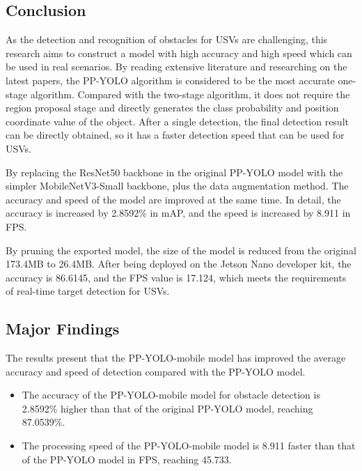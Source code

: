 \documentclass[sensors,article,submit,moreauthors,pdftex]{Definitions/mdpi}
\begin{document}
\begin{paracol}{2}
\section{Conclusion}


As the detection and recognition of obstacles for USVs are challenging, this research aims to construct a model with high accuracy and high speed which can be used in real scenarios. By reading extensive literature and researching on the latest papers, the PP-YOLO algorithm is considered to be the most accurate one-stage algorithm. Compared with the two-stage algorithm, it does not require the region proposal stage and directly generates the class probability and position coordinate value of the object. After a single detection, the final detection result can be directly obtained, so it has a faster detection speed that can be used for USVs.

By replacing the ResNet50 backbone in the original PP-YOLO model with the simpler MobileNetV3-Small backbone, plus the data augmentation method. The accuracy and speed of the model are improved at the same time. In detail, the accuracy is increased by 2.8592\% in mAP, and the speed is increased by 8.911 in FPS.

By pruning the exported model, the size of the model is reduced from the original 173.4MB to 26.4MB. After being deployed on the Jetson Nano developer kit, the accuracy is 86.6145, and the FPS value is 17.124, which meets the requirements of real-time target detection for USVs.

\subsection{Major Findings}
The results present that the PP-YOLO-mobile model has improved the average accuracy and speed of detection compared with the PP-YOLO model.

\begin{itemize}
\item{The accuracy of the PP-YOLO-mobile model for obstacle detection is 2.8592\% higher than that of the original PP-YOLO model, reaching 87.0539\%.}
\end{itemize}

\begin{itemize}
\item{The processing speed of the PP-YOLO-mobile model is 8.911 faster than that of the PP-YOLO model in FPS, reaching 45.733.}

\end{itemize}


\end{paracol}
\end{document}
